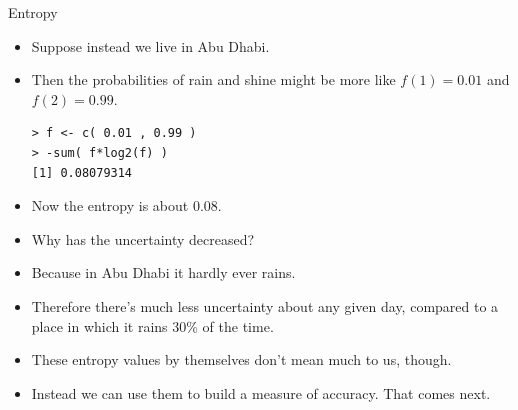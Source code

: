 \documentclass[handout]{beamer}
\begin{document}
\begin{frame}[fragile]{Entropy}
\scriptsize{

\begin{itemize}

\item Suppose instead we live in Abu Dhabi. 

\item Then the probabilities of rain and shine might be more like $f(1) = 0.01$ and $f(2) = 0.99$. 

\begin{verbatim}
> f <- c( 0.01 , 0.99 )
> -sum( f*log2(f) )
[1] 0.08079314
\end{verbatim}


\item Now the entropy is about 0.08. 

\item Why has the uncertainty decreased? 
\item Because in Abu Dhabi it hardly ever rains. 
\item Therefore there's much less uncertainty about any given day, compared to a place in which it rains 30\% of the time.

\item These entropy values by themselves don't mean much to us, though.

\item Instead we can use them to build a measure of accuracy. That comes next.

\end{itemize}


} 
\end{frame}
\end{document}

